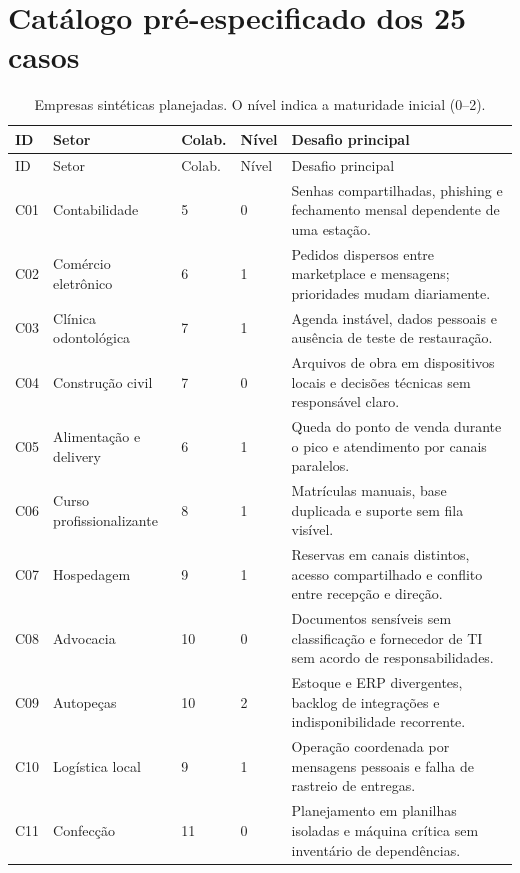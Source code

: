 \clearpage
\appendix
\section{Catálogo pré-especificado dos 25 casos}
\label{ap:casos}

\begingroup
\footnotesize
\renewcommand{\arraystretch}{1.08}
\setlength{\tabcolsep}{4pt}
\begin{longtable}{@{}L{0.8cm}L{2.8cm}L{1.0cm}L{1.0cm}L{7.0cm}@{}}
  \caption{Empresas sintéticas planejadas. O nível indica a maturidade inicial (0--2).}\label{tab:catalogo-casos}\\
  \toprule
  ID & Setor & Colab. & Nível & Desafio principal \\
  \midrule
  \endfirsthead
  \toprule
  ID & Setor & Colab. & Nível & Desafio principal \\
  \midrule
  \endhead
  C01 & Contabilidade & 5 & 0 & Senhas compartilhadas, phishing e fechamento mensal dependente de uma estação. \\
  C02 & Comércio eletrônico & 6 & 1 & Pedidos dispersos entre marketplace e mensagens; prioridades mudam diariamente. \\
  C03 & Clínica odontológica & 7 & 1 & Agenda instável, dados pessoais e ausência de teste de restauração. \\
  C04 & Construção civil & 7 & 0 & Arquivos de obra em dispositivos locais e decisões técnicas sem responsável claro. \\
  C05 & Alimentação e delivery & 6 & 1 & Queda do ponto de venda durante o pico e atendimento por canais paralelos. \\
  C06 & Curso profissionalizante & 8 & 1 & Matrículas manuais, base duplicada e suporte sem fila visível. \\
  C07 & Hospedagem & 9 & 1 & Reservas em canais distintos, acesso compartilhado e conflito entre recepção e direção. \\
  C08 & Advocacia & 10 & 0 & Documentos sensíveis sem classificação e fornecedor de TI sem acordo de responsabilidades. \\
  C09 & Autopeças & 10 & 2 & Estoque e ERP divergentes, backlog de integrações e indisponibilidade recorrente. \\
  C10 & Logística local & 9 & 1 & Operação coordenada por mensagens pessoais e falha de rastreio de entregas. \\
  C11 & Confecção & 11 & 0 & Planejamento em planilhas isoladas e máquina crítica sem inventário de dependências. \\

\end{longtable}
